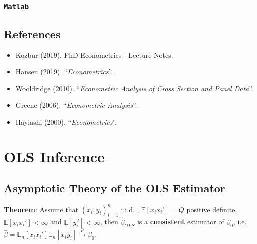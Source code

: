 \documentclass[12pt,]{book}
\newenvironment{Shaded}{\begin{snugshade}}{\end{snugshade}}
\newcommand{\CommentTok}[1]{\textcolor[rgb]{0.56,0.35,0.01}{\textit{#1}}}
\newcommand{\NormalTok}[1]{#1}
\providecommand{\tightlist}{%
  \setlength{\itemsep}{0pt}\setlength{\parskip}{0pt}}
\begin{document}
\hypertarget{matlab-3}{%
\subsection{\texorpdfstring{\texttt{Matlab}}{Matlab}}\label{matlab-3}}

\begin{Shaded}
\end{Shaded}

\hypertarget{references-4}{%
\section{References}\label{references-4}}

\begin{itemize}
\tightlist
\item
  Kozbur (2019). PhD Econometrics - Lecture Notes.
\item
  Hansen (2019). ``\emph{Econometrics}''.
\item
  Wooldridge (2010). ``\emph{Econometric Analysis of Cross Section and Panel Data}''.
\item
  Greene (2006). ``\emph{Econometric Analysis}''.
\item
  Hayiashi (2000). ``\emph{Econometrics}''.
\end{itemize}

\hypertarget{lecture2}{%
\chapter{OLS Inference}\label{lecture2}}

\hypertarget{asymptotic-theory-of-the-ols-estimator}{%
\section{Asymptotic Theory of the OLS Estimator}\label{asymptotic-theory-of-the-ols-estimator}}

\textbf{Theorem}:
Assume that \((x_i, y_i) _ {i=1}^n\) i.i.d. , \(\mathbb E[x_i x_i'] = Q\) positive definite, \(\mathbb E[x_i x_i'] < \infty\) and \(\mathbb E [y_i^2] < \infty\), then \(\hat \beta _ {OLS}\) is a \textbf{consistent} estimator of \(\beta_0\), i.e.~\(\hat \beta = \mathbb E_n [x_i x_i'] \mathbb E_n [x_i y_i]\overset{p}{\to} \beta_0\).
\end{document}
